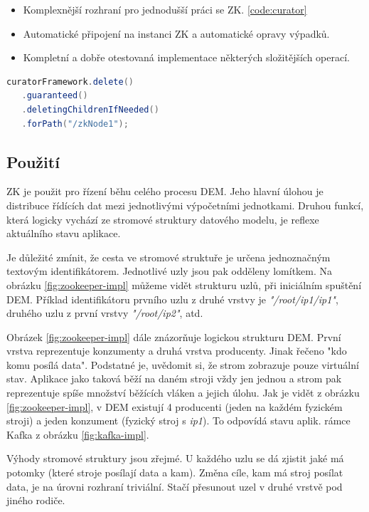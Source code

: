 \documentclass[
  digital, %
  table,   %
  nolof,     %
  nolot,     %
  oneside, %
  nocover,
  monochrome,
  12pt
]{fithesis3}
\begin{document}
\begin{itemize}
  \item Komplexnější rozhraní pro jednodušší práci se ZK. \ref{code:curator}
  \item Automatické připojení na instanci ZK a automatické opravy výpadků.
  \item Kompletní a dobře otestovaná implementace některých složitějších operací.
\end{itemize}

\begin{lstlisting}[label=code:curator,caption={Demonstrace jednoduchého použití aplikačního rámce Curator, na smazání uzlu \textit{zkNode1} a všech jeho potomků.},language=Java]
curatorFramework.delete()
   .guaranteed()
   .deletingChildrenIfNeeded()
   .forPath("/zkNode1");
\end{lstlisting}

 
\subsection*{Použití}
ZK je použit pro řízení běhu celého procesu DEM. Jeho hlavní úlohou je distribuce řídících dat mezi jednotlivými výpočetními jednotkami. Druhou funkcí, která logicky vychází ze stromové struktury datového modelu, je reflexe aktuálního stavu aplikace.

Je důležité zmínit, že cesta ve stromové struktuře je určena jednoznačným textovým identifikátorem. Jednotlivé uzly jsou pak odděleny lomítkem. Na obrázku \ref{fig:zookeeper-impl} můžeme vidět strukturu uzlů, při iniciálním spuštění DEM. Příklad identifikátoru prvního uzlu z druhé vrstvy je \textit{"/root/ip1/ip1"}, druhého uzlu z první vrstvy \textit{"/root/ip2"}, atd.

Obrázek \ref{fig:zookeeper-impl} dále znázorňuje logickou strukturu DEM. První vrstva reprezentuje konzumenty a druhá vrstva producenty. Jinak řečeno "kdo komu posílá data". Podstatné je, uvědomit si, že strom zobrazuje pouze virtuální stav. Aplikace jako taková běží na daném stroji vždy jen jednou a strom pak reprezentuje spíše množství běžících vláken a jejich úlohu. Jak je vidět z obrázku \ref{fig:zookeeper-impl}, v DEM existují 4 producenti (jeden na každém fyzickém stroji) a jeden konzument (fyzický stroj s \textit{ip1}). To odpovídá stavu aplik. rámce Kafka z obrázku \ref{fig:kafka-impl}.

Výhody stromové struktury jsou zřejmé. U každého uzlu se dá zjistit jaké má potomky (které stroje posílají data a kam). Změna cíle, kam má stroj posílat data, je na úrovni rozhraní triviální. Stačí přesunout uzel v druhé vrstvě pod jiného rodiče.
\end{document}
